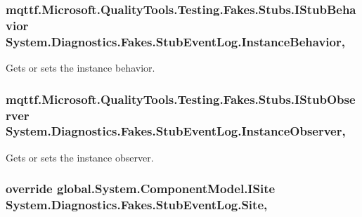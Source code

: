 \hypertarget{class_system_1_1_diagnostics_1_1_fakes_1_1_stub_event_log_a3f584f94c3382856ecaf11ff38634cc2}{
\subsubsection[{Instance\-Behavior}]{\setlength{\rightskip}{0pt plus 5cm}mqttf.\-Microsoft.\-Quality\-Tools.\-Testing.\-Fakes.\-Stubs.\-I\-Stub\-Behavior System.\-Diagnostics.\-Fakes.\-Stub\-Event\-Log.\-Instance\-Behavior\hspace{0.3cm}{\ttfamily [get]}, {\ttfamily [set]}}}\label{class_system_1_1_diagnostics_1_1_fakes_1_1_stub_event_log_a3f584f94c3382856ecaf11ff38634cc2}


Gets or sets the instance behavior.

\hypertarget{class_system_1_1_diagnostics_1_1_fakes_1_1_stub_event_log_a6f7345d6bb682fc098f774d7d39870fb}{
\subsubsection[{Instance\-Observer}]{\setlength{\rightskip}{0pt plus 5cm}mqttf.\-Microsoft.\-Quality\-Tools.\-Testing.\-Fakes.\-Stubs.\-I\-Stub\-Observer System.\-Diagnostics.\-Fakes.\-Stub\-Event\-Log.\-Instance\-Observer\hspace{0.3cm}{\ttfamily [get]}, {\ttfamily [set]}}}\label{class_system_1_1_diagnostics_1_1_fakes_1_1_stub_event_log_a6f7345d6bb682fc098f774d7d39870fb}


Gets or sets the instance observer.

\hypertarget{class_system_1_1_diagnostics_1_1_fakes_1_1_stub_event_log_aaf1cde5d378e9722fc0c1d8677451fe4}{
\subsubsection[{Site}]{\setlength{\rightskip}{0pt plus 5cm}override global.\-System.\-Component\-Model.\-I\-Site System.\-Diagnostics.\-Fakes.\-Stub\-Event\-Log.\-Site\hspace{0.3cm}{\ttfamily [get]}, {\ttfamily [set]}}}\label{class_system_1_1_diagnostics_1_1_fakes_1_1_stub_event_log_aaf1cde5d378e9722fc0c1d8677451fe4}


